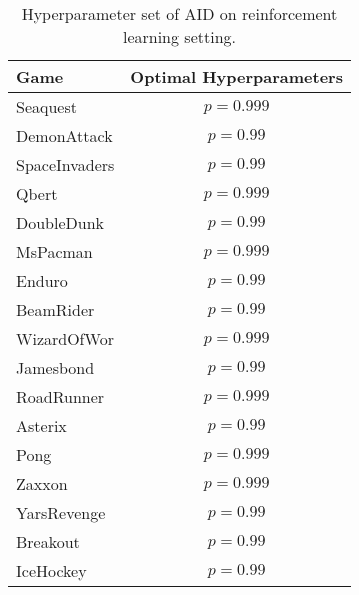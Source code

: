 

\begin{table}[H]
    \vspace{2.5cm}
    \centering
    \caption{\centering Hyperparameter set of AID on reinforcement learning setting.}
    \begin{tabular}{l|c}
        \toprule
        \textbf{Game} &\textbf{Optimal Hyperparameters} \\
        \midrule
        Seaquest & $p=0.999$\\
        DemonAttack & $p=0.99$\\
        SpaceInvaders & $p=0.99$\\
        Qbert & $p=0.999$\\
        DoubleDunk & $p=0.99$\\
        MsPacman & $p=0.999$\\
        Enduro & $p=0.99$\\
        BeamRider & $p=0.99$\\
        WizardOfWor & $p=0.999$\\
        Jamesbond & $p=0.99$\\
        RoadRunner & $p=0.999$\\
        Asterix & $p=0.99$\\
        Pong & $p=0.999$\\
        Zaxxon & $p=0.999$\\
        YarsRevenge & $p=0.99$\\
        Breakout & $p=0.99$\\
        IceHockey & $p=0.99$\\
        
        \bottomrule
    \end{tabular}
    \label{tab:hyperparameter_rl}
\end{table}
\vfill

